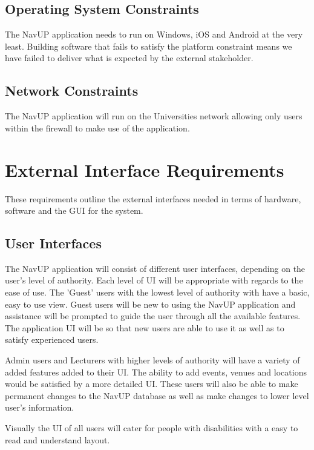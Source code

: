 \documentclass{article}
\begin{document}
		\subsection{Operating System Constraints}			   
 				The NavUP application needs to run on Windows, iOS and Android at the very least. Building software that fails to satisfy the platform constraint means we have failed to deliver what is expected by the external stakeholder. 
 				
 		\subsection{Network Constraints}			 
 				The NavUP application will run on the Universities network allowing only users within the firewall to make use of the application.
 				
 	\pagebreak
 	
	\section{External Interface Requirements}
	These requirements outline the external interfaces needed in terms of hardware, software and the GUI for the system.
	
	\subsection{User Interfaces}

The NavUP application will consist of different user interfaces, depending on the user's level of authority. Each level of UI will be appropriate with 
regards to the ease of use. The 'Guest' users with the lowest level of authority with have a basic, easy to use view. Guest users will be new to using
the NavUP application and assistance will be prompted to guide the user through all the available features. The application UI will be so that
new users are able to use it as well as to satisfy experienced users.


Admin users and Lecturers with higher levels of authority will have a variety of added features added to their UI. The ability to add events, venues and
locations would be satisfied by a more detailed UI. These users will also be able to make permanent changes to the NavUP database as well as make changes
to lower level user's information.


Visually the UI of all users will cater for people with disabilities with a easy to read and understand layout.
\end{document}
